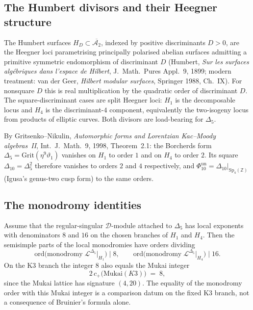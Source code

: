 \subsection{The Humbert divisors and their Heegner structure}

\begin{definition}
\label{def:humbert-divisors}
The Humbert surfaces $H_D\subset\overline{\mathcal{A}_2}$, indexed by positive discriminants $D>0$, are the Heegner loci parametrising principally polarised abelian surfaces admitting a primitive symmetric endomorphism of discriminant $D$ (Humbert, \emph{Sur les surfaces algébriques dans l'espace de Hilbert}, J.~Math.~Pures Appl.~9, 1899; modern treatment: van der Geer, \emph{Hilbert modular surfaces}, Springer 1988, Ch.~IX). For nonsquare $D$ this is real multiplication by the quadratic order of discriminant $D$. The square-discriminant cases are split Heegner loci: $H_1$ is the decomposable locus and $H_4$ is the discriminant-$4$ component, equivalently the two-isogeny locus from products of elliptic curves. Both divisors are load-bearing for $\Delta_5$.
\end{definition}

\begin{remark}
\label{fact:delta5-vanishing-humbert}
By Gritsenko--Nikulin, \emph{Automorphic forms and Lorentzian Kac--Moody algebras~II}, Int.~J.~Math.~9, 1998, Theorem~2.1: the Borcherds form $\Delta_5 = \mathrm{Grit}(\eta^9\vartheta_1)$ vanishes on $H_1$ to order $1$ and on $H_4$ to order $2$. Its square $\Delta_{10}=\Delta_5^2$ therefore vanishes to orders $2$ and $4$ respectively, and $\Phi_{10}^{\mathrm{un}} = \Delta_{10}|_{\mathrm{Sp}_4(\mathbb{Z})}$ (Igusa's genus-two cusp form) to the same orders.
\end{remark}

\subsection{The monodromy identities}

\begin{proposition}
\label{prop:humbert-monodromy-K-kappa}
Assume that the regular-singular $\mathcal{D}$-module attached to $\Delta_5$ has local exponents with denominators $8$ and $16$ on the chosen branches of $H_1$ and $H_4$. Then the semisimple parts of the local monodromies have orders dividing
\[
 \mathrm{ord}\bigl(\mathrm{monodromy}\;\mathcal{L}^{\Delta_5}\big|_{H_1}\bigr)
 \mid 8,
 \qquad
 \mathrm{ord}\bigl(\mathrm{monodromy}\;\mathcal{L}^{\Delta_5}\big|_{H_4}\bigr)
 \mid 16.
\]
On the K3 branch the integer $8$ also equals the Mukai integer
\[
 2\,c_+\bigl(\mathrm{Mukai}(K3)\bigr)
 \;=\;
 8,
\]
since the Mukai lattice has signature $(4,20)$. The equality of the monodromy order with this Mukai integer is a comparison datum on the fixed K3 branch, not a consequence of Bruinier's formula alone.
\end{proposition}

